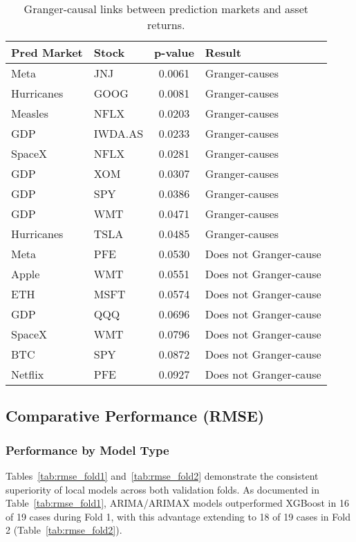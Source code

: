 \documentclass[12pt]{report}
\begin{document}
\begin{table}[ht]
\centering
\begin{tabular}{|l|l|c|l|}
\hline
\textbf{Pred Market} & \textbf{Stock} & \textbf{p-value} & \textbf{Result} \\
\hline
Meta & JNJ & 0.0061 & Granger-causes \\
Hurricanes & GOOG & 0.0081 & Granger-causes \\
Measles & NFLX & 0.0203 & Granger-causes \\
GDP & IWDA.AS & 0.0233 & Granger-causes \\
SpaceX & NFLX & 0.0281 & Granger-causes \\
GDP & XOM & 0.0307 & Granger-causes \\
GDP & SPY & 0.0386 & Granger-causes \\
GDP & WMT & 0.0471 & Granger-causes \\
Hurricanes & TSLA & 0.0485 & Granger-causes \\
Meta & PFE & 0.0530 & Does not Granger-cause \\
Apple & WMT & 0.0551 & Does not Granger-cause \\
ETH & MSFT & 0.0574 & Does not Granger-cause \\
GDP & QQQ & 0.0696 & Does not Granger-cause \\
SpaceX & WMT & 0.0796 & Does not Granger-cause \\
BTC & SPY & 0.0872 & Does not Granger-cause \\
Netflix & PFE & 0.0927 & Does not Granger-cause \\
\hline
\end{tabular}
\caption{Granger-causal links between prediction markets and asset returns.}
\label{tab:granger_causality}
\end{table}

\subsection{Comparative Performance (RMSE)}

\subsubsection{Performance by Model Type}
Tables~\ref{tab:rmse_fold1} and~\ref{tab:rmse_fold2} demonstrate the consistent superiority of local models across both validation folds. As documented in Table~\ref{tab:rmse_fold1}, ARIMA/ARIMAX models outperformed XGBoost in 16 of 19 cases during Fold 1, with this advantage extending to 18 of 19 cases in Fold 2 (Table~\ref{tab:rmse_fold2}).\\
\end{document}

